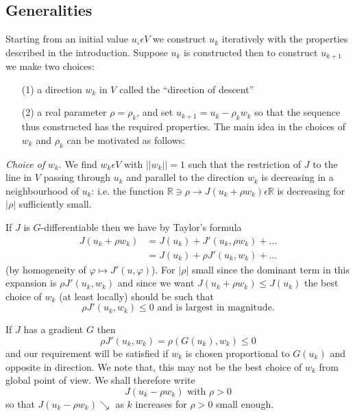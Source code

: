 \subsection{Generalities}\label{chap3-subsec1.1}

Starting from an initial value $u_{\circ} \epsilon V$ we construct $u_{k}$ iteratively with the properties described in the introduction. Suppose $u_{k}$ is constructed then to construct $u_{k+1}$ we make two choices:
\begin{enumerate}
\item[(1)] a direction $w_{k}$ in $V$ called the ``direction of descent''

\item[(2)] a real parameter $\rho = \rho_{k}$, and set $u_{k+1} = u_{k}-\rho_{k} w_{k}$ so that the sequence thus constructed has the required properties. The main idea in the choices of $w_{k}$ and $\rho_{k}$ can be motivated as follows: 
\end{enumerate}

{\em Choice of} $w_{k}$. We find $w_{k} \epsilon V$ with $||w_{k}|| = 1$ such that the restriction of $J$ to the line in $V$ passing through $u_{k}$ and parallel to the direction $w_{k}$ is decreasing in a neighbourhood of $u_{k}$: i.e. the function $\mathbb{R} \ni \rho \to J(u_{k} + \rho w_{k}) \epsilon \mathbb{R}$ is decreasing for\pageoriginale $|\rho|$ sufficiently small.


If $J$ is $G$-differentiable then we have by Taylor's formula
\begin{align*}
J(u_{k} + \rho w_{k}) & = J(u_{k}) + J'(u_{k}, \rho w_{k}) + \ldots\\
& = J(u_{k}) + \rho J'(u_{k}, w_{k}) + \ldots
\end{align*}
(by homogeneity of $\varphi \mapsto J' (u, \varphi)$). For $|\rho|$ small since the dominant term in this expansion is $\rho J'(u_{k}, w_{k})$ and since we want $J(u_{k} + \rho w_{k}) \leq J(u_{k})$ the best choice of $w_{k}$ (at least locally) should be such that
$$
\rho J'(u_{k}, w_{k}) \leq 0 \text{ and is largest in magnitude.}
$$

If $J$ has a gradient $G$ then
$$
\rho J'(u_{k}, w_{k}) = \rho (G(u_{k}), w_{k}) \leq 0
$$
and our requirement will be satisfied if $w_{k}$ is chosen proportional to $G(u_{k})$ and opposite in direction. We note that, this may not be the best choice of $w_{k}$ from global point of view. We shall therefore write
$$
J(u_{k} - \rho w_{k}) \text{ with } \rho > 0
$$
so that $J(u_{k} - \rho w_{k})\searrow$ as $k$ increases for $\rho > 0$ small enough.

